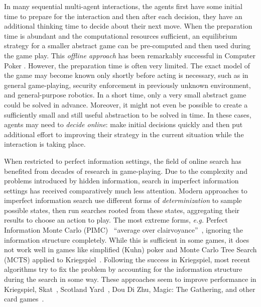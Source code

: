 \documentclass[letterpaper]{article}
\newcommand{\eg}{{\it e.g.}\xspace}
\begin{document}
In many sequential multi-agent interactions, the agents first have some initial time to prepare for the interaction and then after each decision, they have an additional thinking time to decide about their next move. When the preparation time is abundant and the computational resources sufficient, an equilibrium strategy for a smaller abstract game can be pre-computed and then used during the game play. This {\it offline approach} has been remarkably successful in Computer Poker \cite{}.
However, the preparation time is often very limited. The exact model of the game may become known only shortly before acting is necessary, such as in general game-playing, security enforcement in previously unknown environment, and general-purpose robotics. In a short time, only a very small abstract game could be solved in advance. Moreover, it might not even be possible to create a sufficiently small and still useful abstraction to be solved in time. In these cases, agents may need to {\it decide online}: make initial decisions quickly and then put additional effort to improving their strategy in the current situation while the interaction is taking place.

When restricted to perfect information settings, the field of online search has benefited from decades of research in game-playing. 
Due to the complexity and problems introduced by hidden information, search in imperfect information settings has received comparatively much less attention.
Modern approaches to imperfect information search use different forms of {\it determinization} to sample possible states, then run 
searches rooted from these states, aggregating their results to choose an action to play. The most extreme forms, \eg Perfect Information Monte Carlo (PIMC)~\cite{Long10Understanding} ``average over clairvoyance''~\cite{AIBook},
ignoring the information structure completely. While this is sufficient in some games, it does not work well in games like simplified (Kuhn) poker and 
Monte Carlo Tree Search (MCTS) applied to Kriegspiel~\cite{Ciancarini10Kriegspiel}. 
Following the success in Kriegspiel, most recent algorithms try to fix the problem by accounting for the information structure during the 
search in some way. These approaches seem to improve performance in Kriegspiel, Skat~\cite{Furtak13Recursive}, 
Scotland Yard~\cite{Nijssen12SY}, Dou Di Zhu, Magic: The Gathering, and other card games~\cite{Cowling12MTG,Cowling12ISMCTS}.
\end{document}

